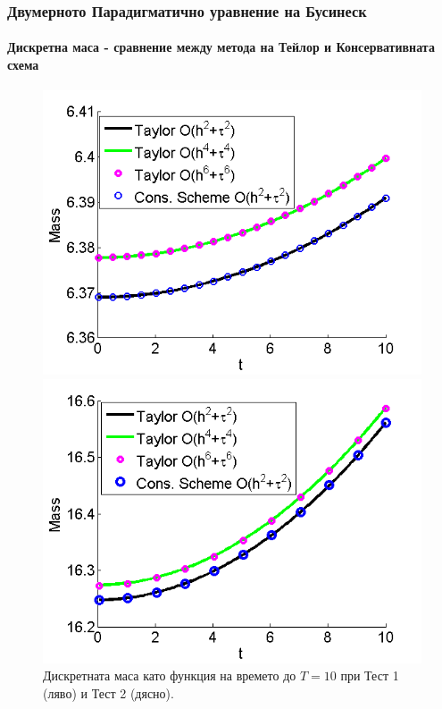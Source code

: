 \documentclass{beamer}
\begin{document}

\begin{frame}
\frametitle{Двумерното Парадигматично уравнение на Бусинеск}
\framesubtitle{Дискретна маса - сравнение между метода на Тейлор и Консервативната схема}

\begin{figure}[ht]\vspace{0.4cm}
	\begin{minipage}[b]{0.49\linewidth}
		 \includegraphics[width=\linewidth]{Mass_bt3_c045_h005_Oh2_Oh4_Oh6.png}
	\end{minipage}	
	\begin{minipage}[b]{0.49\linewidth}
		\includegraphics[width=\linewidth]{Mass_bt1_c090_h010_Oh2_Oh4_Oh6.png}	
	\end{minipage}
\caption{Дискретната маса като функция на времето до $T = 10$ при Тест 1 (ляво) и Тест 2 (дясно).}
\label{Test1En}
\end{figure}

\end{frame}
\end{document}
